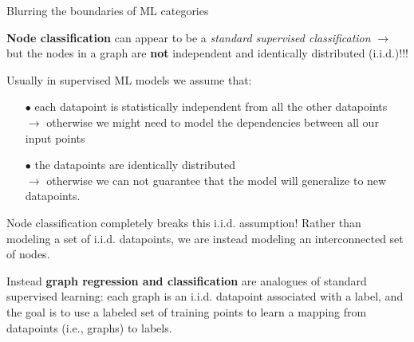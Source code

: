 \documentclass[10pt, aspectratio=169, compress, protectframetitle, handout]{beamer}
\begin{document}
\begin{frame}{Blurring the boundaries of ML categories}

    \textbf{Node classification} can appear to be a \emph{standard supervised classification} $\longrightarrow$ but the nodes in a graph are \alert{\textbf{not} independent and identically distributed (i.i.d.)!!!}
    
    Usually in supervised ML models we assume that:
    \begin{itemize}
        \item[\alert{$\bullet$}] each datapoint is statistically independent from all the other datapoints\\
        $\rightarrow$ otherwise we might need to model the dependencies between all our input points
        \item[\alert{$\bullet$}] the datapoints are identically distributed\\
        $\rightarrow$ otherwise we can not guarantee that the model will generalize to new datapoints.
    \end{itemize}
    
    \alert{Node classification completely breaks this i.i.d. assumption!} Rather than modeling a set of i.i.d. datapoints, we are instead modeling an interconnected set of nodes.
    
    Instead \textbf{graph regression and classification} are analogues of standard supervised learning: each graph is an i.i.d. datapoint associated with a label, and the goal is to use a labeled set of training points to learn a mapping from datapoints (i.e., graphs) to labels.
    
\end{frame}
\end{document}
